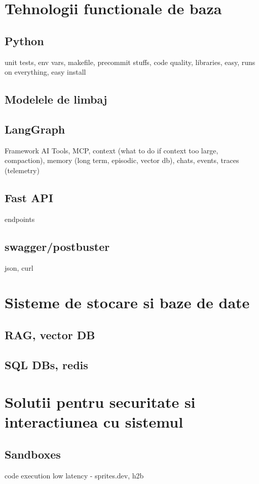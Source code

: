 \documentclass[12pt, a4paper, oneside, romanian, draft]{teza-upb}
\begin{document}
  \section{Tehnologii functionale de baza}
    \subsection{Python}
    unit tests, env vars, makefile, precommit stuffs, code quality, libraries, easy, runs on everything, easy install
    \subsection{Modelele de limbaj}
    \subsection{LangGraph}
    Framework AI
    Tools, MCP, context (what to do if context too large, compaction), memory (long term, episodic, vector db), chats,
    events, traces (telemetry)
    \subsection{Fast API}
    endpoints
    \subsection{swagger/postbuster}
    json, curl


  \section{Sisteme de stocare si baze de date}
    \subsection{RAG, vector DB}
    \subsection{SQL DBs, redis}


  \section{Solutii pentru securitate si interactiunea cu sistemul}
    \subsection{Sandboxes}
    code execution low latency - sprites.dev, h2b
\end{document}
